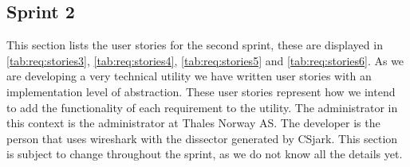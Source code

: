 \subsection{Sprint 2}
\label{sec:req:stories2}
This section lists the user stories for the second sprint, these are displayed in \autoref{tab:req:stories3}, \autoref{tab:req:stories4},
\autoref{tab:req:stories5} and \autoref{tab:req:stories6}.
As we are developing a very technical \gls{utility} we have written user stories with an implementation level of abstraction. 
These user stories represent how we intend to add the functionality of each requirement to the \gls{utility}.
The administrator in this context is the administrator at Thales Norway AS. 
The developer is the person that uses \Gls{wireshark} with the \gls{dissector} generated by CSjark.
This section is subject to change throughout the sprint, as we do not know all the details yet.


